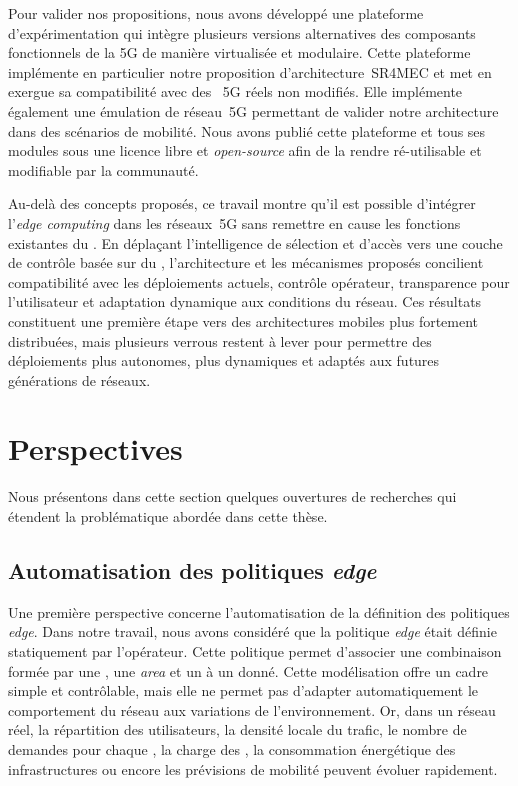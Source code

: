 \documentclass[../main.tex]{subfiles}
\begin{document}
Pour valider nos propositions, nous avons développé une plateforme d’expérimentation qui intègre plusieurs versions alternatives des composants fonctionnels de la 5G de manière virtualisée et modulaire.
Cette plateforme implémente en particulier notre proposition d’architecture~SR4MEC et met en exergue sa compatibilité avec des ~5G réels non modifiés.
Elle implémente également une émulation de réseau~5G permettant de valider notre architecture dans des scénarios de mobilité.
Nous avons publié cette plateforme et tous ses modules sous une licence libre et \textit{open-source} afin de la rendre ré-utilisable et modifiable par la communauté.

\pagebreak
Au-delà des concepts proposés, ce travail montre qu’il est possible d’intégrer l’\textit{edge computing} dans les réseaux~5G sans remettre en cause les fonctions existantes du .
En déplaçant l’intelligence de sélection et d’accès vers une couche de contrôle basée sur du , l’architecture et les mécanismes proposés concilient compatibilité avec les déploiements actuels, contrôle opérateur, transparence pour l’utilisateur et adaptation dynamique aux conditions du réseau.
Ces résultats constituent une première étape vers des architectures mobiles plus fortement distribuées, mais plusieurs verrous restent à lever pour permettre des déploiements plus autonomes, plus dynamiques et adaptés aux futures générations de réseaux.

\enlargethispage{1\baselineskip}
\section*{Perspectives}
Nous présentons dans cette section quelques ouvertures de recherches qui étendent la problématique abordée dans cette thèse.

\subsection*{Automatisation des politiques \textit{edge}}
Une première perspective concerne l’automatisation de la définition des politiques \textit{edge}.
Dans notre travail, nous avons considéré que la politique \textit{edge} était définie statiquement par l’opérateur.
Cette politique permet d’associer une combinaison formée par une , une \textit{area} et un  à un  donné.
Cette modélisation offre un cadre simple et contrôlable, mais elle ne permet pas d’adapter automatiquement le comportement du réseau aux variations de l’environnement.
Or, dans un réseau réel, la répartition des utilisateurs, la densité locale du trafic, le nombre de demandes pour chaque , la charge des , la consommation énergétique des infrastructures ou encore les prévisions de mobilité peuvent évoluer rapidement.
\end{document}
